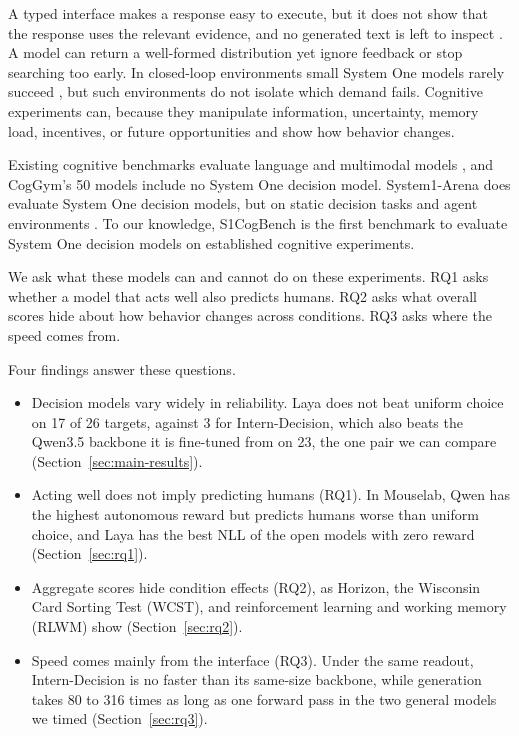 \documentclass[11pt,a4paper]{article}
\newcommand{\bench}{S1CogBench}
\begin{document}
A typed interface makes a response easy to execute, but it does not show that the response uses the relevant evidence, and no generated text is left to inspect \citep{sharma2026typedbench}. A model can return a well-formed distribution yet ignore feedback or stop searching too early. In closed-loop environments small System One models rarely succeed \citep{chen2026system1arena}, but such environments do not isolate which demand fails. Cognitive experiments can, because they manipulate information, uncertainty, memory load, incentives, or future opportunities and show how behavior changes.

Existing cognitive benchmarks evaluate language and multimodal models \citep{codaforno2024cogbench,binz2025centaur,ying2026coggym,nie2025evolve,hou2026cogarena}, and CogGym's 50 models include no System One decision model. System1-Arena does evaluate System One decision models, but on static decision tasks and agent environments \citep{chen2026system1arena}. To our knowledge, \bench{} is the first benchmark to evaluate System One decision models on established cognitive experiments.

We ask what these models can and cannot do on these experiments. RQ1 asks whether a model that acts well also predicts humans. RQ2 asks what overall scores hide about how behavior changes across conditions. RQ3 asks where the speed comes from.

Four findings answer these questions.
\begin{itemize}[leftmargin=*,itemsep=1pt,topsep=2pt]
\item Decision models vary widely in reliability. Laya does not beat uniform choice on 17 of 26 targets, against 3 for Intern-Decision, which also beats the Qwen3.5 backbone it is fine-tuned from on 23, the one pair we can compare (Section~\ref{sec:main-results}).
\item Acting well does not imply predicting humans (RQ1). In Mouselab, Qwen has the highest autonomous reward but predicts humans worse than uniform choice, and Laya has the best NLL of the open models with zero reward (Section~\ref{sec:rq1}).
\item Aggregate scores hide condition effects (RQ2), as Horizon, the Wisconsin Card Sorting Test (WCST), and reinforcement learning and working memory (RLWM) show (Section~\ref{sec:rq2}).
\item Speed comes mainly from the interface (RQ3). Under the same readout, Intern-Decision is no faster than its same-size backbone, while generation takes 80 to 316 times as long as one forward pass in the two general models we timed (Section~\ref{sec:rq3}).
\end{itemize}
\end{document}
